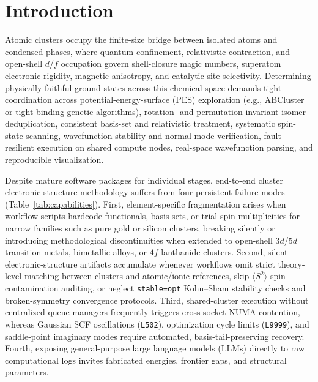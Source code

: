 \documentclass[journal=jctcce,manuscript=article]{achemso}
\begin{document}
\section{Introduction}

Atomic clusters occupy the finite-size bridge between isolated atoms and condensed phases, where quantum confinement, relativistic contraction, and open-shell $d$/$f$ occupation govern shell-closure magic numbers, superatom electronic rigidity, magnetic anisotropy, and catalytic site selectivity.\cite{pyykko2002wau12,li2002wau12,jian2019pes} Determining physically faithful ground states across this chemical space demands tight coordination across potential-energy-surface (PES) exploration (e.g., ABCluster\cite{zhang2015abcluster} or tight-binding genetic algorithms\cite{bannwarth2019gfn2xtb,larsen2017ase}), rotation- and permutation-invariant isomer deduplication, consistent basis-set and relativistic treatment,\cite{weigend2005def2,pantazis2009sarc,reiher2006dkh,dolg2012ecp,pritchard2019bse} systematic spin-state scanning,\cite{cramer2009tm} wavefunction stability and normal-mode verification,\cite{bauernschmitt1996stability} fault-resilient execution on shared compute nodes,\cite{ong2013pymatgen} real-space wavefunction parsing,\cite{oboyle2008cclib,lu2012multiwfn} and reproducible visualization.\cite{humphrey1996vmd}

Despite mature software packages for individual stages, end-to-end cluster electronic-structure methodology suffers from four persistent failure modes (Table~\ref{tab:capabilities}). First, element-specific fragmentation arises when workflow scripts hardcode functionals, basis sets, or trial spin multiplicities for narrow families such as pure gold or silicon clusters, breaking silently or introducing methodological discontinuities when extended to open-shell $3d$/$5d$ transition metals, bimetallic alloys, or $4f$ lanthanide clusters. Second, silent electronic-structure artifacts accumulate whenever workflows omit strict theory-level matching between clusters and atomic/ionic references, skip $\langle S^2 \rangle$ spin-contamination auditing, or neglect \texttt{stable=opt} Kohn--Sham stability checks\cite{bauernschmitt1996stability} and broken-symmetry convergence protocols. Third, shared-cluster execution without centralized queue managers frequently triggers cross-socket NUMA contention, whereas Gaussian SCF oscillations (\texttt{L502}), optimization cycle limits (\texttt{L9999}), and saddle-point imaginary modes require automated, basis-tail-preserving recovery. Fourth, exposing general-purpose large language models (LLMs) directly to raw computational logs invites fabricated energies, frontier gaps, and structural parameters.\cite{bran2024chemcrow,boiko2023coscientist}
\end{document}
